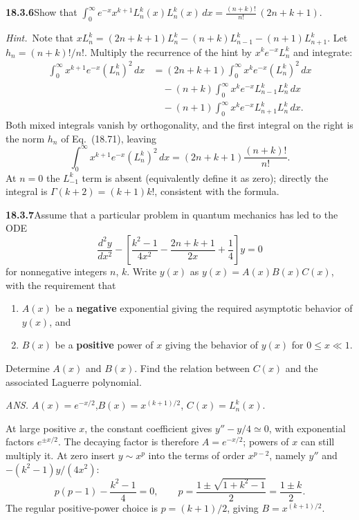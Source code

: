 \par\bigskip
\noindent\textbf{18.3.6}\quad Show that
$\displaystyle\int_{0}^{\infty}e^{-x}x^{k+1}
L_{n}^{k}(x)L_{n}^{k}(x)\,dx
=\frac{(n+k)!}{n!}\,(2n+k+1)$.
\par\emph{Hint.}~Note that
$xL_{n}^{k}=(2n+k+1)L_{n}^{k}-(n+k)L_{n-1}^{k}-(n+1)L_{n+1}^{k}$.
\solution
Let $h_n=(n+k)!/n!$.  Multiply the recurrence of the hint by
$x^ke^{-x}L_n^k$ and integrate:
\begin{align*}
\int_0^\infty x^{k+1}e^{-x}(L_n^k)^2\,dx
 &=(2n+k+1)\int_0^\infty x^ke^{-x}(L_n^k)^2\,dx\\
 &\quad-(n+k)\int_0^\infty x^ke^{-x}L_{n-1}^kL_n^k\,dx\\
 &\quad-(n+1)\int_0^\infty x^ke^{-x}L_{n+1}^kL_n^k\,dx.
\end{align*}
Both mixed integrals vanish by orthogonality, and the first integral
on the right is the norm $h_n$ of Eq.~(18.71), leaving
\[
\boxed{\int_0^\infty x^{k+1}e^{-x}(L_n^k)^2\,dx
       =(2n+k+1)\frac{(n+k)!}{n!}}.
\]
At $n=0$ the $L_{-1}^k$ term is absent (equivalently define it
as zero); directly the integral is $\Gamma(k+2)=(k+1)k!$,
consistent with the formula.

\par\bigskip
\noindent\textbf{18.3.7}\quad Assume that a particular problem in
quantum mechanics has led to the ODE
\[
\frac{d^{2}y}{dx^{2}}-\left[\frac{k^{2}-1}{4x^{2}}
-\frac{2n+k+1}{2x}+\frac{1}{4}\right]y=0
\]
for nonnegative integers $n$, $k$. Write $y(x)$ as
$y(x)=A(x)B(x)C(x)$, with the requirement that
\begin{enumerate}
\item[(a)] $A(x)$ be a \textbf{negative} exponential giving the
required asymptotic behavior of $y(x)$, and
\item[(b)] $B(x)$ be a \textbf{positive} power of $x$ giving the
behavior of $y(x)$ for $0\le x\ll1$.
\end{enumerate}
Determine $A(x)$ and $B(x)$. Find the relation between $C(x)$ and
the associated Laguerre polynomial.
\par\nobreak\hfill\emph{ANS.}\enspace
$A(x)=e^{-x/2}$,\quad $B(x)=x^{(k+1)/2}$,\quad
$C(x)=L_{n}^{k}(x)$.
\par\nobreak
\solution
At large positive $x$, the constant coefficient gives
$y''-y/4\simeq0$, with exponential factors $e^{\pm x/2}$.
The decaying factor is therefore $A=e^{-x/2}$; powers of $x$
can still multiply it.
At zero insert $y\sim x^p$ into the terms of order $x^{p-2}$, namely
$y''$ and $-(k^2-1)y/(4x^2)$:
\[
p(p-1)-\frac{k^2-1}{4}=0,
\qquad p=\frac{1\pm\sqrt{1+k^2-1}}{2}=\frac{1\pm k}{2}.
\]
The regular positive-power choice is $p=(k+1)/2$, giving
$B=x^{(k+1)/2}$.

